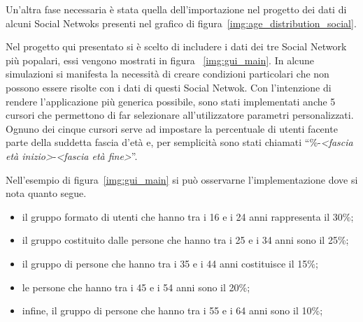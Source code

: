 Un'altra fase necessaria è stata quella dell'importazione nel progetto dei dati di alcuni Social Netwoks
presenti nel grafico di figura~\ref{img:age_distribution_social}.

Nel progetto qui presentato si è scelto di includere i dati dei tre Social Network più popalari, 
essi vengono mostrati in figura ~\ref{img:gui_main}.
In alcune simulazioni si manifesta la necessità di creare condizioni particolari che non possono essere risolte con i dati 
di questi Social Netwok.
Con l'intenzione di rendere l'applicazione più generica possibile, sono stati implementati anche 5 cursori 
che permettono di far selezionare all'utilizzatore parametri personalizzati.
Ognuno dei cinque cursori serve ad impostare la percentuale di utenti facente parte della suddetta fascia d'età e, per
semplicità sono stati chiamati ``\%-\emph{<fascia età inizio>}-\emph{<fascia età fine>}''.

Nell'esempio di figura~\ref{img:gui_main} si può osservarne l'implementazione dove si nota quanto segue.
\begin{itemize}
 \item il gruppo formato di utenti che hanno tra i 16 e i 24 anni rappresenta il 30\%;
 \item il gruppo costituito dalle persone che hanno tra i 25 e i 34 anni sono il 25\%;
 \item il gruppo di persone che hanno tra i 35 e i 44 anni costituisce il 15\%;
 \item le persone che hanno tra i 45 e i 54 anni sono il 20\%;
 \item infine, il gruppo di persone che hanno tra i 55 e i 64 anni sono il 10\%;
\end{itemize}

